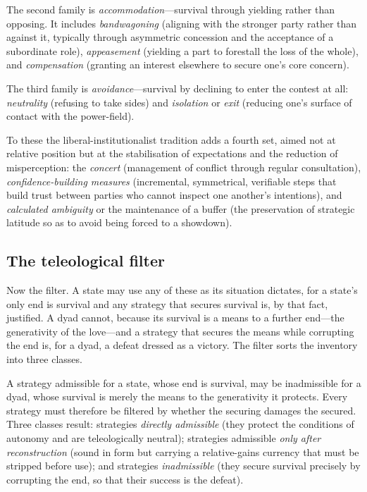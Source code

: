 The second family is \emph{accommodation}---survival through yielding rather than opposing. It includes \emph{bandwagoning} (aligning with the stronger party rather than against it, typically through asymmetric concession and the acceptance of a subordinate role), \emph{appeasement} (yielding a part to forestall the loss of the whole), and \emph{compensation} (granting an interest elsewhere to secure one's core concern).

The third family is \emph{avoidance}---survival by declining to enter the contest at all: \emph{neutrality} (refusing to take sides) and \emph{isolation} or \emph{exit} (reducing one's surface of contact with the power-field).

To these the liberal-institutionalist tradition adds a fourth set, aimed not at relative position but at the stabilisation of expectations and the reduction of misperception: the \emph{concert} (management of conflict through regular consultation), \emph{confidence-building measures} (incremental, symmetrical, verifiable steps that build trust between parties who cannot inspect one another's intentions), and \emph{calculated ambiguity} or the maintenance of a buffer (the preservation of strategic latitude so as to avoid being forced to a showdown).

\subsection{The teleological filter}
\label{p17:sub:practices-filter}

Now the filter. A state may use any of these as its situation dictates, for a state's only end is survival and any strategy that secures survival is, by that fact, justified. A dyad cannot, because its survival is a means to a further end---the generativity of the love---and a strategy that secures the means while corrupting the end is, for a dyad, a defeat dressed as a victory. The filter sorts the inventory into three classes.

\begin{claim}
A strategy admissible for a state, whose end is survival, may be inadmissible for a dyad, whose survival is merely the means to the generativity it protects. Every strategy must therefore be filtered by whether the securing damages the secured. Three classes result: strategies \emph{directly admissible} (they protect the conditions of autonomy and are teleologically neutral); strategies admissible \emph{only after reconstruction} (sound in form but carrying a relative-gains currency that must be stripped before use); and strategies \emph{inadmissible} (they secure survival precisely by corrupting the end, so that their success is the defeat).
\end{claim}

